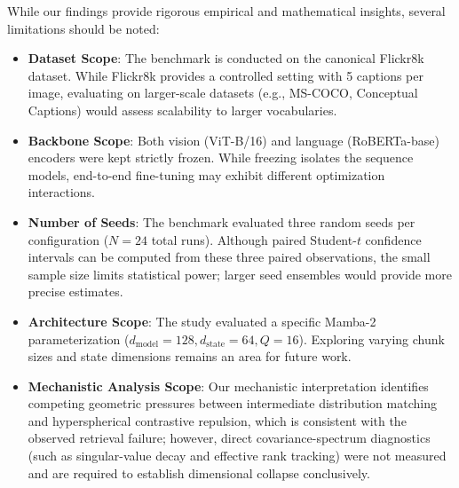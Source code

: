 \documentclass[conference]{IEEEtran}
\begin{document}
While our findings provide rigorous empirical and mathematical insights, several limitations should be noted:
\begin{itemize}
    \item \textbf{Dataset Scope}: The benchmark is conducted on the canonical Flickr8k dataset. While Flickr8k provides a controlled setting with 5 captions per image, evaluating on larger-scale datasets (e.g., MS-COCO, Conceptual Captions) would assess scalability to larger vocabularies.
    \item \textbf{Backbone Scope}: Both vision (ViT-B/16) and language (RoBERTa-base) encoders were kept strictly frozen. While freezing isolates the sequence models, end-to-end fine-tuning may exhibit different optimization interactions.
    \item \textbf{Number of Seeds}: The benchmark evaluated three random seeds per configuration ($N=24$ total runs). Although paired Student-$t$ confidence intervals can be computed from these three paired observations, the small sample size limits statistical power; larger seed ensembles would provide more precise estimates.
    \item \textbf{Architecture Scope}: The study evaluated a specific Mamba-2 parameterization ($d_{\mathrm{model}}=128, d_{\mathrm{state}}=64, Q=16$). Exploring varying chunk sizes and state dimensions remains an area for future work.
    \item \textbf{Mechanistic Analysis Scope}: Our mechanistic interpretation identifies competing geometric pressures between intermediate distribution matching and hyperspherical contrastive repulsion, which is consistent with the observed retrieval failure; however, direct covariance-spectrum diagnostics (such as singular-value decay and effective rank tracking) were not measured and are required to establish dimensional collapse conclusively.
\end{itemize}

\end{document}
